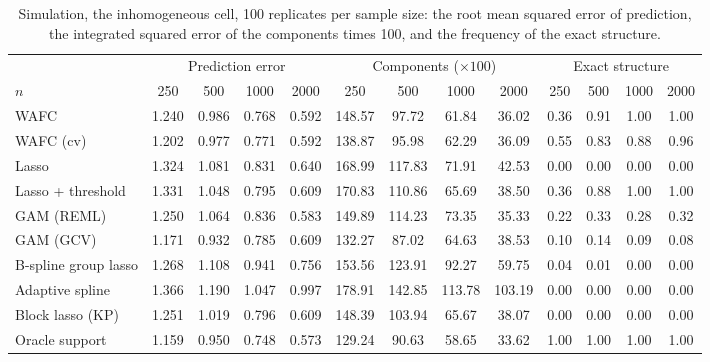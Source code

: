 \begin{table}[tp]
\color{colR1}
\caption{Simulation, the inhomogeneous cell, 100 replicates per sample size: the root mean squared error of prediction, the integrated squared error of the components times 100, and the frequency of the exact structure.}
\label{tab:sim-sizes-inhomogeneous}
\centering
\footnotesize
\setlength{\tabcolsep}{3pt}
\begin{tabular}{l cccc cccc cccc}
\hline
 & \multicolumn{4}{c}{Prediction error} & \multicolumn{4}{c}{Components ($\times 100$)} & \multicolumn{4}{c}{Exact structure} \\
$n$ & 250 & 500 & 1000 & 2000 & 250 & 500 & 1000 & 2000 & 250 & 500 & 1000 & 2000 \\
\hline
WAFC & 1.240 & 0.986 & 0.768 & 0.592 & 148.57 & 97.72 & 61.84 & 36.02 & 0.36 & 0.91 & 1.00 & 1.00 \\
WAFC (cv) & 1.202 & 0.977 & 0.771 & 0.592 & 138.87 & 95.98 & 62.29 & 36.09 & 0.55 & 0.83 & 0.88 & 0.96 \\
Lasso & 1.324 & 1.081 & 0.831 & 0.640 & 168.99 & 117.83 & 71.91 & 42.53 & 0.00 & 0.00 & 0.00 & 0.00 \\
Lasso + threshold & 1.331 & 1.048 & 0.795 & 0.609 & 170.83 & 110.86 & 65.69 & 38.50 & 0.36 & 0.88 & 1.00 & 1.00 \\
GAM (REML) & 1.250 & 1.064 & 0.836 & 0.583 & 149.89 & 114.23 & 73.35 & 35.33 & 0.22 & 0.33 & 0.28 & 0.32 \\
GAM (GCV) & 1.171 & 0.932 & 0.785 & 0.609 & 132.27 & 87.02 & 64.63 & 38.53 & 0.10 & 0.14 & 0.09 & 0.08 \\
B-spline group lasso & 1.268 & 1.108 & 0.941 & 0.756 & 153.56 & 123.91 & 92.27 & 59.75 & 0.04 & 0.01 & 0.00 & 0.00 \\
Adaptive spline & 1.366 & 1.190 & 1.047 & 0.997 & 178.91 & 142.85 & 113.78 & 103.19 & 0.00 & 0.00 & 0.00 & 0.00 \\
Block lasso (KP) & 1.251 & 1.019 & 0.796 & 0.609 & 148.39 & 103.94 & 65.67 & 38.07 & 0.00 & 0.00 & 0.00 & 0.00 \\
Oracle support & 1.159 & 0.950 & 0.748 & 0.573 & 129.24 & 90.63 & 58.65 & 33.62 & 1.00 & 1.00 & 1.00 & 1.00 \\
\hline
\end{tabular}
\end{table}

